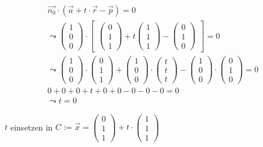\begin{gather}
\vec{n_0} \cdot (\vec{a}+t\cdot \vec{r}-\vec{p})=0\\
\leadsto 
\begin{pmatrix}
1\\0\\0
\end{pmatrix} \cdot 
\begin{bmatrix}
\begin{pmatrix}
0\\1\\1
\end{pmatrix}
+ t
\begin{pmatrix}
1\\1\\1
\end{pmatrix}
-
\begin{pmatrix}
0\\1\\0
\end{pmatrix}
\end{bmatrix} = 0\\
\leadsto
\begin{pmatrix}
1\\0\\0
\end{pmatrix}\cdot
\begin{pmatrix}
0\\1\\1
\end{pmatrix}
+
\begin{pmatrix}
1\\0\\0
\end{pmatrix}
\cdot
\begin{pmatrix}
t\\t\\t
\end{pmatrix}
-
\begin{pmatrix}
1\\0\\0
\end{pmatrix}
\cdot
\begin{pmatrix}
0\\1\\0
\end{pmatrix} =0\\
0+0+0+t+0+0-0-0-0=0\\
\leadsto t=0
\end{gather}

\ensuremath{t} einsetzen in \ensuremath{C:= \vec{x}=\begin{pmatrix}
		0\\1\\1
	\end{pmatrix} +t\cdot\begin{pmatrix}
		1\\1\\1
\end{pmatrix}}\\

